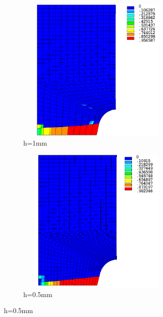 \documentclass[12pt,openright,twoside]{report}
\begin{document}
\\
\begin{figure}[htbp!]
 \centering
     \captionsetup[subfigure]{justification=centering}
     \begin{subfigure}{0.4\textwidth}
      \centering
         \includegraphics[width=8cm,height=7.2cm,keepaspectratio]{25.d2-1.png}
         \caption{h=1mm}
         \label{fig:d2-1}
     \end{subfigure}
     \hspace{1.8cm}
     \begin{subfigure}{0.4\textwidth}
      \centering
         \includegraphics[width=8cm,height=7.2cm,keepaspectratio]{25.d2-0.5.png}
         \caption{h=0.5mm}
         \label{fig:d2-0.5}
     \end{subfigure}
\end{figure}
\end{document}
